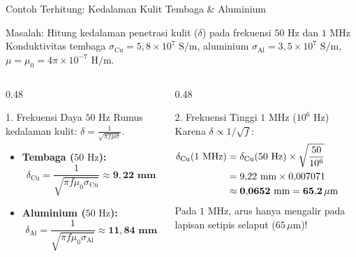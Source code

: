 \documentclass[aspectratio=169,10pt]{beamer}
\begin{document}
\begin{frame}{Contoh Terhitung: Kedalaman Kulit Tembaga \& Aluminium}
  \begin{exampleblock}{Masalah: Hitung kedalaman penetrasi kulit ($\delta$) pada frekuensi $50\text{ Hz}$ dan $1\text{ MHz}$}
    Konduktivitas tembaga $\sigma_{\text{Cu}} = 5{,}8 \times 10^7\text{ S/m}$, aluminium $\sigma_{\text{Al}} = 3{,}5 \times 10^7\text{ S/m}$, $\mu = \mu_0 = 4\pi \times 10^{-7}\text{ H/m}$.
  \end{exampleblock}
  \begin{columns}[t]
    \begin{column}{0.48\textwidth}
      \begin{block}{1. Frekuensi Daya $50\text{ Hz}$}
        \small
        Rumus kedalaman kulit: $\delta = \frac{1}{\sqrt{\pi f \mu \sigma}}$.
        \begin{itemize}
          \item \textbf{Tembaga ($50\text{ Hz}$):}
          \begin{equation*}
            \delta_{\text{Cu}} = \frac{1}{\sqrt{\pi f \mu_0 \sigma_{\text{Cu}}}} \approx \mathbf{9{,}22\text{ mm}}
          \end{equation*}
          \item \textbf{Aluminium ($50\text{ Hz}$):}
          \begin{equation*}
            \delta_{\text{Al}} = \frac{1}{\sqrt{\pi f \mu_0 \sigma_{\text{Al}}}} \approx \mathbf{11{,}84\text{ mm}}
          \end{equation*}
        \end{itemize}
      \end{block}
    \end{column}
    \begin{column}{0.48\textwidth}
      \begin{alertblock}{2. Frekuensi Tinggi $1\text{ MHz}$ ($10^6\text{ Hz}$)}
        \small
        Karena $\delta \propto 1/\sqrt{f}$:
        \begin{align*}
          \delta_{\text{Cu}}(1\text{ MHz}) &= \delta_{\text{Cu}}(50\text{ Hz}) \times \sqrt{\frac{50}{10^6}} \\
          &= 9{,}22\text{ mm} \times 0{,}007071 \\
          &\approx \mathbf{0{,}0652\text{ mm} = 65{,}2\,\mu\text{m}} \quad \qed
        \end{align*}
        Pada $1\text{ MHz}$, arus hanya mengalir pada lapisan setipis selaput ($65\,\mu\text{m}$)!
      \end{alertblock}
    \end{column}
  \end{columns}
\end{frame}
\end{document}
